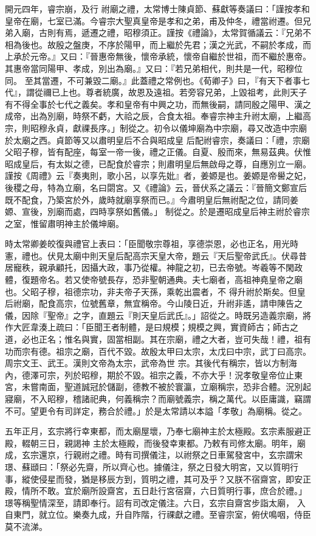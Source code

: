 \begin{pinyinscope}
 開元四年，睿宗崩，及行
 祔廟之禮，太常博士陳貞節、蘇獻等奏議曰：「謹按孝和皇帝在廟，七室已滿。今睿宗大聖真皇帝是孝和之弟，甫及仲冬，禮當祔遷。但兄弟入廟，古則有焉，遞遷之禮，昭穆須正。謹按《禮論》，太常賀循議云：『兄弟不相為後也。故殷之盤庚，不序於陽甲，而上繼於先君；漢之光武，不嗣於孝成，而上承於元帝。』又曰：『晉惠帝無後，懷帝承統，懷帝自繼於世祖，而不繼於惠帝。其惠帝當同陽甲、孝成，別出為廟。』又曰：『若兄弟相代，則共是一代，昭穆位同。
 至其當遷，不可兼毀二廟。』此蓋禮之常例也。《荀卿子》曰，『有天下者事七代』，謂從禰已上也。尊者統廣，故恩及遠祖。若旁容兄弟，上毀祖考，此則天子有不得全事於七代之義矣。孝和皇帝有中興之功，而無後嗣，請同殷之陽甲、漢之成帝，出為別廟，時祭不虧，大祫之辰，合食太祖。奉睿宗神主升祔太廟，上繼高宗，則昭穆永貞，獻祼長序。」制從之。初令以儀坤廟為中宗廟，尋又改造中宗廟於太廟之西。貞節等又以肅明皇后不合與昭成皇
 后配祔睿宗，奏議曰：「禮，宗廟父昭子穆，皆有配座，每室一帝一後，禮之正儀。自夏、殷而來，無易茲典。伏惟昭成皇后，有太姒之德，已配食於睿宗；則肅明皇后無啟母之尊，自應別立一廟。謹按《周禮》云『奏夷則，歌小呂，以享先妣』者，姜嫄是也。姜嫄是帝嚳之妃，後稷之母，特為立廟，名曰閟宮。又《禮論》云，晉伏系之議云：『晉簡文鄭宣后既不配食，乃築宮於外，歲時就廟享祭而已。』今肅明皇后無祔配之位，請同姜嫄、宣後，別廟而處，四時享祭如舊儀。」
 制從之。於是遷昭成皇后神主祔於睿宗之室，惟留肅明神主於儀坤廟。



 時太常卿姜皎復與禮官上表曰：「臣聞敬宗尊祖，享德崇恩，必也正名，用光時憲，禮也。伏見太廟中則天皇后配高宗天皇大帝，題云『天后聖帝武氏』。伏尋昔居寵秩，親承顧托，因攝大政，事乃從權。神龍之初，已去帝號。岑羲等不閑政體，復題帝名。若又使帝號長存，恐非聖朝通典。夫七廟者，高祖神堯皇帝之廟也。父昭子穆，祖德宗功，非夫帝子天孫，乘乾出震者，不
 得升祔於斯矣。但皇后祔廟，配食高宗，位號舊章，無宜稱帝。今山陵日近，升祔非遙，請申陳告之儀，因除『聖帝』之字，直題云『則天皇后武氏』。」詔從之。時既另造義宗廟，將作大匠韋湊上疏曰：「臣聞王者制體，是曰規模；規模之興，實資師古；師古之道，必也正名；惟名與實，固當相副。其在宗廟，禮之大者，豈可失哉！禮，祖有功而宗有德。祖宗之廟，百代不毀。故殷太甲曰太宗，太戊曰中宗，武丁曰高宗。周宗文王、武王。漢則文帝為太宗，武帝為世
 宗。其後代有稱宗，皆以方制海內，德澤可宗，列於昭穆，期於不毀。祖宗之義，不亦大乎！況孝敬皇帝位止東宮，未嘗南面，聖道誠冠於儲副，德教不被於寰瀛，立廟稱宗，恐非合體。況別起寢廟，不入昭穆，稽諸祀典，何義稱宗？而廟號義宗，稱之萬代。以臣庸識，竊謂不可。望更令有司詳定，務合於禮。」於是太常請以本謚「孝敬」為廟稱。從之。



 五年正月，玄宗將行幸東都，而太廟屋壞，乃奉七廟神主於太極殿。玄宗素服避正殿，輟朝三日，親謁神
 主於太極殿，而後發幸東都。乃敕有司修太廟。明年，廟成，玄宗還京，行親祔之禮。時有司撰儀注，以祔祭之日車駕發宮中，玄宗謂宋璟、蘇頲曰：「祭必先齋，所以齊心也。據儀注，祭之日發大明宮，又以質明行事，縱使侵星而發，猶是移辰方到，質明之禮，其可及乎？又朕不宿齋宮，即安正殿，情所不敢。宜於廟所設齋宮，五日赴行宮宿齋，六日質明行事，庶合於禮。」璟等稱聖情深至，請即奉行。詔有司改定儀注。六日，玄宗自齋宮步詣太廟，
 入自東門，就立位。樂奏九成，升自阼階，行祼獻之禮。至睿宗室，俯伏鳴咽，侍臣莫不流涕。




\end{pinyinscope}
